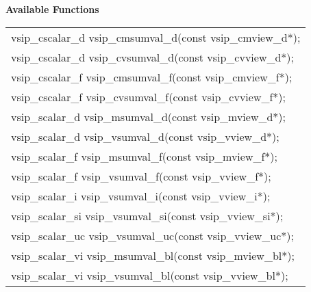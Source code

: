 \cvsiplh
\newline \hspace*{.8cm} \vspace*{.1cm} \textbf{Available Functions }
\newline \hspace*{1.1cm} {
\ttfamily
\begin{tabular}[H]{l}
vsip\_cscalar\_d vsip\_cmsumval\_d(const vsip\_cmview\_d*);\\
vsip\_cscalar\_d vsip\_cvsumval\_d(const vsip\_cvview\_d*);\\
vsip\_cscalar\_f vsip\_cmsumval\_f(const vsip\_cmview\_f*);\\
vsip\_cscalar\_f vsip\_cvsumval\_f(const vsip\_cvview\_f*);\\
vsip\_scalar\_d vsip\_msumval\_d(const vsip\_mview\_d*);\\
vsip\_scalar\_d vsip\_vsumval\_d(const vsip\_vview\_d*);\\
vsip\_scalar\_f vsip\_msumval\_f(const vsip\_mview\_f*);\\
vsip\_scalar\_f vsip\_vsumval\_f(const vsip\_vview\_f*);\\
vsip\_scalar\_i vsip\_vsumval\_i(const vsip\_vview\_i*);\\
vsip\_scalar\_si vsip\_vsumval\_si(const vsip\_vview\_si*);\\
vsip\_scalar\_uc vsip\_vsumval\_uc(const vsip\_vview\_uc*);\\
vsip\_scalar\_vi vsip\_msumval\_bl(const vsip\_mview\_bl*);\\
vsip\_scalar\_vi vsip\_vsumval\_bl(const vsip\_vview\_bl*);\\
\end{tabular}
}
\pyjvsiph